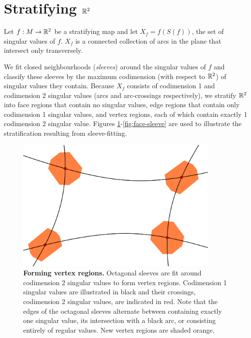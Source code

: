 \section{Stratifying $\mathbb{R}^2$}
\label{section:smooth-decompose}

Let $f:M\to\mathbb{R}^2$ be a stratifying map and let $X_f = f(S(f))$, the set of singular values of $f$.
$X_f$ is a connected collection of arcs in the plane that intersect only transversely.

We fit closed neighbourhoods (\emph{sleeves}) around the singular values of $f$ and classify these sleeves by the maximum codimension (with respect to $\mathbb{R}^2$) of singular values they contain.
Because $X_f$ consists of codimension 1 and codimension 2 singular values (arcs and arc-crossings respectively), we stratify $\mathbb{R}^2$ into face regions that contain no singular values, edge regions that contain only codimension 1 singular values, and vertex regions, each of which contain exactly 1 codimension 2 singular value.
Figures \ref{fig:vertex-sleeve}-\ref{fig:face-sleeve} are used to illustrate the stratification resulting from sleeve-fitting.

\begin{figure}[h!]
	\centering
	\includegraphics[width=0.9\textwidth]{figures/vertex-sleeve.png}
	\caption{
		\textbf{Forming vertex regions.}
		Octagonal sleeves are fit around codimension 2 singular values to form vertex regions.
		Codimension 1 singular values are illustrated in black and their crossings, codimension 2 singular values, are indicated in red.
		Note that the edges of the octagonal sleeves alternate between containing exactly one singular value, its intersection with a black arc, or consisting entirely of regular values.
		New vertex regions are shaded orange.
	}
	\label{fig:vertex-sleeve}
\end{figure}

